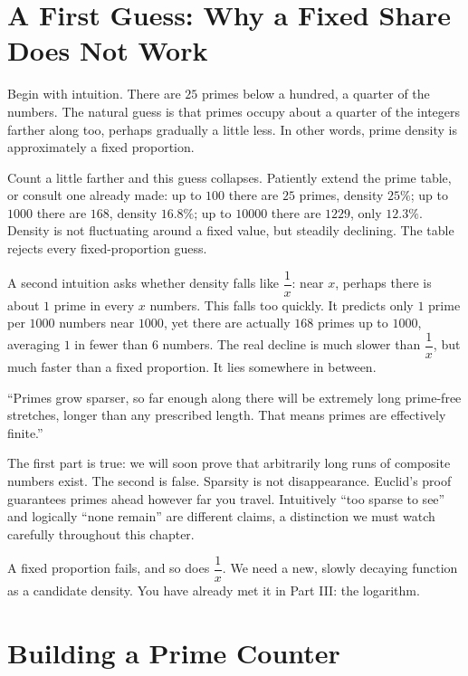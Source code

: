 \section{A First Guess: Why a Fixed Share Does Not Work}

Begin with intuition. There are $25$ primes below a hundred, a quarter of the numbers. The natural guess is that primes occupy about a quarter of the integers farther along too, perhaps gradually a little less. In other words, prime density is approximately a fixed proportion.

Count a little farther and this guess collapses. Patiently extend the prime table, or consult one already made: up to $100$ there are $25$ primes, density $25\%$; up to $1000$ there are $168$, density $16.8\%$; up to $10000$ there are $1229$, only $12.3\%$. Density is not fluctuating around a fixed value, but steadily declining. The table rejects every fixed-proportion guess.

A second intuition asks whether density falls like $\dfrac{1}{x}$: near $x$, perhaps there is about $1$ prime in every $x$ numbers. This falls too quickly. It predicts only $1$ prime per $1000$ numbers near $1000$, yet there are actually $168$ primes up to $1000$, averaging $1$ in fewer than $6$ numbers. The real decline is much slower than $\dfrac{1}{x}$, but much faster than a fixed proportion. It lies somewhere in between.

\begin{fanli}
``Primes grow sparser, so far enough along there will be extremely long prime-free stretches, longer than any prescribed length. That means primes are effectively finite.''

The first part is true: we will soon prove that arbitrarily long runs of composite numbers exist. The second is false. Sparsity is not disappearance. Euclid's proof guarantees primes ahead however far you travel. Intuitively ``too sparse to see'' and logically ``none remain'' are different claims, a distinction we must watch carefully throughout this chapter.
\end{fanli}

A fixed proportion fails, and so does $\dfrac{1}{x}$. We need a new, slowly decaying function as a candidate density. You have already met it in Part III: the logarithm.

\section{Building a Prime Counter}

